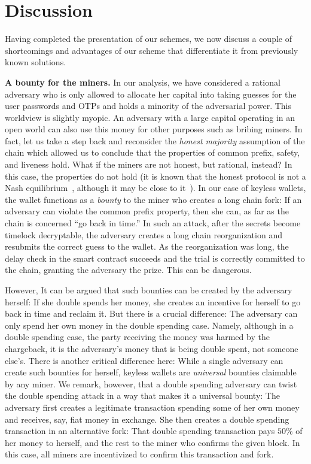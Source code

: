 \section{Discussion}

Having completed the presentation of our schemes, we now discuss a couple of
shortcomings and advantages of our scheme that differentiate it from previously
known solutions.

\noindent
\textbf{A bounty for the miners.}
In our analysis, we have considered a rational adversary who is only allowed
to allocate her capital into taking guesses for the user passwords and OTPs
and holds a minority of the adversarial power. This worldview is
slightly myopic. An adversary with a large capital operating in an open world
can also use this money for other purposes such as bribing miners.
In fact, let us
take a step back and reconsider the
\emph{honest majority} assumption of the chain which allowed us to conclude
that the properties of common prefix, safety, and liveness hold. What if the
miners are not honest, but rational, instead? In this case, the properties
do not hold (it is known that the honest protocol is not a Nash
equilibrium~\cite{selfish}, although it may be close to it~\cite{mining-games}).
In our case of keyless wallets, the wallet functions as a \emph{bounty}
to the miner who creates a long chain fork: If an
adversary can violate the common prefix property, then she can, as far
as the chain is concerned ``go back in time.'' In such an attack,
after the secrets become timelock decryptable, the adversary creates a
long chain reorganization and resubmits the correct guess to the wallet.
As the reorganization was long, the delay check in the smart contract
succeeds and the trial is correctly committed to the chain,
granting the adversary the prize. This can be dangerous.

However, It can be argued that such bounties can be created by the adversary
herself: If she double spends her money, she creates an incentive
for herself to go back in time and reclaim it. But there is
a crucial difference: The adversary can only spend her own money in the double spending
case. Namely, although in a double spending case, the party receiving the
money was harmed by the chargeback, it is the adversary's money that is
being double spent, not someone else's. There is another critical
difference here: While a single adversary can create such bounties for
herself, keyless wallets are \emph{universal} bounties claimable by any miner.
We remark, however, that a double spending adversary
can twist the double spending attack in a way that makes it a universal
bounty: The adversary first
creates a legitimate transaction spending some of her own money and
receives, say, fiat money in exchange. She then creates a double spending
transaction in an alternative fork: That double spending transaction
pays $50\%$ of her money to herself, and the rest to the miner who
confirms the given block. In this case, all miners are incentivized
to confirm this transaction and fork.

